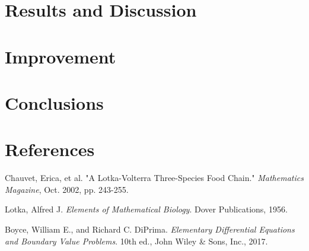 \documentclass[11pt,oneside]{article}
\begin{document}
	\section{Results and Discussion}
	
	\section{Improvement}
	
	\section{Conclusions}
	
	\section{References}
	\begin{hangparas}{.25in}{1}
		Chauvet, Erica, et al. "A Lotka-Volterra Three-Species Food Chain." \textit{Mathematics Magazine}, Oct. 2002, pp. 243-255.
		
		Lotka, Alfred J. \textit{Elements of Mathematical Biology}. Dover Publications, 1956.
		
		Boyce, William E., and Richard C. DiPrima. \textit{Elementary Differential Equations and Boundary Value Problems}. 10th ed., John Wiley \& Sons, Inc., 2017.
		
		
	\end{hangparas}
	
\end{document}
